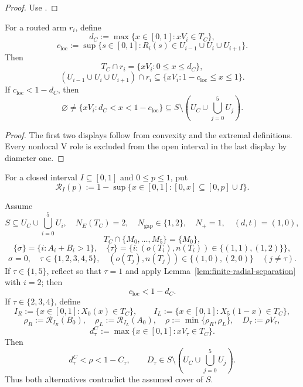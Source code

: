 \begin{proof}
Use .
\end{proof}

\begin{lemma}
\label{lem:finite-radial-separation}
For a routed arm $r_i$, define
\[
 d_C:=\max\{x\in[0,1]:xV_i\in T_C\},
\]
\[
 c_{\mathrm{loc}}:=
 \sup\{s\in[0,1]:R_i(s)\in U_{i-1}\cup U_i\cup U_{i+1}\}.
\]
Then
\[
 T_C\cap r_i=\{xV_i:0\le x\le d_C\},
\]
\[
 (U_{i-1}\cup U_i\cup U_{i+1})\cap r_i
 \subseteq\{xV_i:1-c_{\mathrm{loc}}\le x\le1\}.
\]
If $c_{\mathrm{loc}}<1-d_C$, then
\[
 \varnothing\ne\{xV_i:d_C<x<1-c_{\mathrm{loc}}\}
 \subseteq
 S\setminus\left(U_C\cup\bigcup_{j=0}^5U_j\right).
\]
\end{lemma}

\begin{proof}
The first two displays follow from convexity and the extremal definitions.
Every nonlocal V role is excluded from the open interval in the last display
by diameter one.
\end{proof}

\begin{definition}
\label{def:finite-residual-operator}
For a closed interval $I\subseteq[0,1]$ and $0\le p\le1$, put
\[
 \mathcal R_I(p):=
 1-\sup\{x\in[0,1]:[0,x]\subseteq[0,p]\cup I\}.
\]
\end{definition}

\begin{proposition}
\label{prop:finite-vd-radial-separation}
Assume
\[
 S\subseteq U_C\cup\bigcup_{i=0}^5U_i,
 \quad N_E(T_C)=2,
 \quad N_{\mathrm{gap}}\in\{1,2\},
 \quad N_+=1,
 \quad(d,t)=(1,0),
\]
\[
 T_C\cap\{M_0,\ldots,M_5\}=\{M_0\},
\]
\[
 \{\sigma\}=\{i:A_i+B_i>1\},
 \quad
 \{\tau\}=\{i:(o(T_i),n(T_i))\in\{(1,1),(1,2)\}\},
\]
\[
 \sigma=0,
 \quad \tau\in\{1,2,3,4,5\},
 \quad
 (o(T_j),n(T_j))\in\{(1,0),(2,0)\}\quad(j\ne\tau).
\]
If $\tau\in\{1,5\}$, reflect so that $\tau=1$ and apply
Lemma~\ref{lem:finite-radial-separation} with $i=2$; then
\[
 c_{\mathrm{loc}}<1-d_C.
\]
If $\tau\in\{2,3,4\}$, define
\[
 I_R:=\{x\in[0,1]:X_0(x)\in T_C\},
 \qquad
 I_L:=\{x\in[0,1]:X_5(1-x)\in T_C\},
\]
\[
 \rho_R:=\mathcal R_{I_R}(B_0),
 \quad \rho_L:=\mathcal R_{I_L}(A_0),
 \quad \rho:=\min\{\rho_R,\rho_L\},
 \quad D_\tau:=\rho V_\tau,
\]
\[
 d_\tau^C:=\max\{x\in[0,1]:xV_\tau\in T_C\}.
\]
Then
\[
 d_\tau^C<\rho<1-C_\tau,
 \qquad
 D_\tau\in
 S\setminus\left(U_C\cup\bigcup_{j=0}^5U_j\right).
\]
Thus both alternatives contradict the assumed cover of $S$.
\end{proposition}


